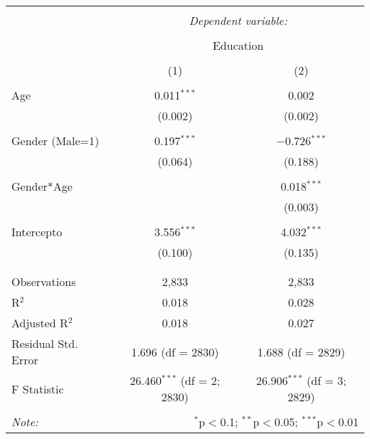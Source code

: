
\begin{table}[!htbp] \centering 
  \caption{} 
  \label{} 
\begin{tabular}{@{\extracolsep{5pt}}lcc} 
\\[-1.8ex]\hline 
\hline \\[-1.8ex] 
 & \multicolumn{2}{c}{\textit{Dependent variable:}} \\ 
\cline{2-3} 
\\[-1.8ex] & \multicolumn{2}{c}{Education} \\ 
\\[-1.8ex] & (1) & (2)\\ 
\hline \\[-1.8ex] 
 Age & 0.011$^{***}$ & 0.002 \\ 
  & (0.002) & (0.002) \\ 
  & & \\ 
 Gender (Male=1) & 0.197$^{***}$ & $-$0.726$^{***}$ \\ 
  & (0.064) & (0.188) \\ 
  & & \\ 
 Gender*Age &  & 0.018$^{***}$ \\ 
  &  & (0.003) \\ 
  & & \\ 
 Intercepto & 3.556$^{***}$ & 4.032$^{***}$ \\ 
  & (0.100) & (0.135) \\ 
  & & \\ 
\hline \\[-1.8ex] 
Observations & 2,833 & 2,833 \\ 
R$^{2}$ & 0.018 & 0.028 \\ 
Adjusted R$^{2}$ & 0.018 & 0.027 \\ 
Residual Std. Error & 1.696 (df = 2830) & 1.688 (df = 2829) \\ 
F Statistic & 26.460$^{***}$ (df = 2; 2830) & 26.906$^{***}$ (df = 3; 2829) \\ 
\hline 
\hline \\[-1.8ex] 
\textit{Note:}  & \multicolumn{2}{r}{$^{*}$p$<$0.1; $^{**}$p$<$0.05; $^{***}$p$<$0.01} \\ 
\end{tabular} 
\end{table} 
